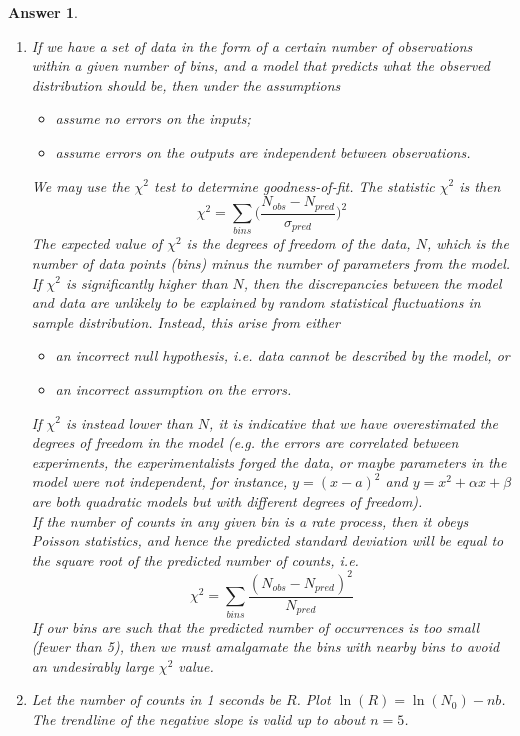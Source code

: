 \documentclass[a4paper]{article}
\newtheorem{ans}{Answer}[subsection]
\theoremstyle{new}
\begin{document}
\begin{ans}\leavevmode
\begin{enumerate}[label=(\alph*)]
\item If we have a set of data in the form of a certain number of observations within a given number of bins, and a model that predicts what the observed distribution should be, then under the assumptions
\begin{itemize}
    \item assume no errors on the inputs;
    \item assume errors on the outputs are independent between observations.
\end{itemize}
We may use the $\chi^2$ test to determine goodness-of-fit. The statistic $\chi^2$ is then
$$\chi^2=\sum_{bins}\bigg(\frac{N_{obs}-N_{pred}}{\sigma_{pred}}\bigg)^2$$
The expected value of $\chi^2$ is the degrees of freedom of the data, $N$, which is the number of data points (bins) minus the number of parameters from the model. If $\chi^2$ is significantly higher than $N$, then the discrepancies between the model and data are unlikely to be explained by random statistical fluctuations in sample distribution. Instead, this arise from either
\begin{itemize}
    \item an incorrect null hypothesis, i.e. data cannot be described by the model, or
    \item an incorrect assumption on the errors.
\end{itemize}
If $\chi^2$ is instead lower than $N$, it is indicative that we have overestimated the degrees of freedom in the model (e.g. the errors are correlated between experiments, the experimentalists forged the data, or maybe parameters in the model were not independent, for instance, $y=(x-a)^2$ and $y=x^2+\alpha x+\beta$ are both quadratic models but with different degrees of freedom).\\[5pt]
If the number of counts in any given bin is a rate process, then it obeys Poisson statistics, and hence the predicted standard deviation will be equal to the square root of the predicted number of counts, i.e.
$$\chi^2=\sum_{bins}\frac{(N_{obs}-N_{pred})^2}{N_{pred}}$$
If our bins are such that the predicted number of occurrences is too small (fewer than 5), then we must amalgamate the bins with nearby bins to avoid an undesirably large $\chi^2$ value.
\item Let the number of counts in 1 seconds be $R$. Plot $\ln(R)=\ln(N_0)-nb$. The trendline of the negative slope is valid up to about $n=5$.

\end{enumerate}
\end{ans}
\end{document}
